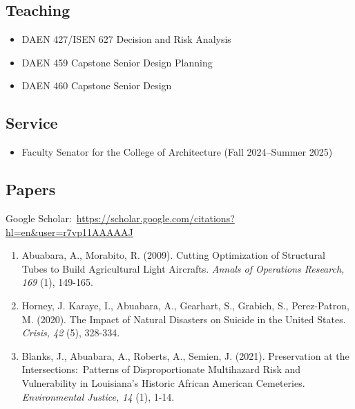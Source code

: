 \documentclass[11pt]{article}
\begin{document}
\subsection*{Teaching}
\vspace{-5pt}
\begin{itemize}[leftmargin=20pt]
\item DAEN 427/ISEN 627 Decision and Risk Analysis
\item DAEN 459 Capstone Senior Design Planning
\item DAEN 460 Capstone Senior Design
\end{itemize}

\subsection*{Service}
\vspace{-5pt}
\begin{itemize}[leftmargin=20pt]
\item Faculty Senator for the College of Architecture (Fall 2024--Summer 2025)
\end{itemize}

\subsection*{Papers}
\vspace{-5pt}
{Google Scholar:~\url{https://scholar.google.com/citations?hl=en&user=r7vp11AAAAAJ}}
\begin{enumerate}[leftmargin=20pt]
\item Abuabara, A., Morabito, R. (2009). Cutting Optimization of Structural Tubes to Build Agricultural Light Aircrafts. \emph{Annals of Operations Research, 169} (1), 149-165.
\item Horney, J. Karaye, I., Abuabara, A., Gearhart, S., Grabich, S., Perez-Patron, M. (2020). The Impact of Natural Disasters on Suicide in the United States. \emph{Crisis, 42} (5), 328-334.
\item Blanks, J., Abuabara, A., Roberts, A., Semien, J. (2021). Preservation at the Intersections:~Patterns of Disproportionate Multihazard Risk and Vulnerability in Louisiana's Historic African American Cemeteries. \emph{Environmental Justice, 14} (1), 1-14.
\end{enumerate}
\end{document}
